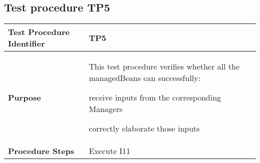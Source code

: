 \subsection{Test procedure TP5}

\begin{table}[!htbp]
\begin{center}
\begin{tabular}[t]{p{}p{}}

\hline
\textbf{Test Procedure Identifier} & TP5 \\
\hline
\textbf{Purpose} & This test procedure verifies whether all the managedBeans can successfully:
\begin{itemize*}
	\item receive inputs from the corresponding Managers 
	\item correctly elaborate those inputs
\end{itemize*} \\
\textbf{Procedure Steps} & Execute I11 \\
\hline

\end{tabular}
\end{center}
\end{table}
\clearpage
